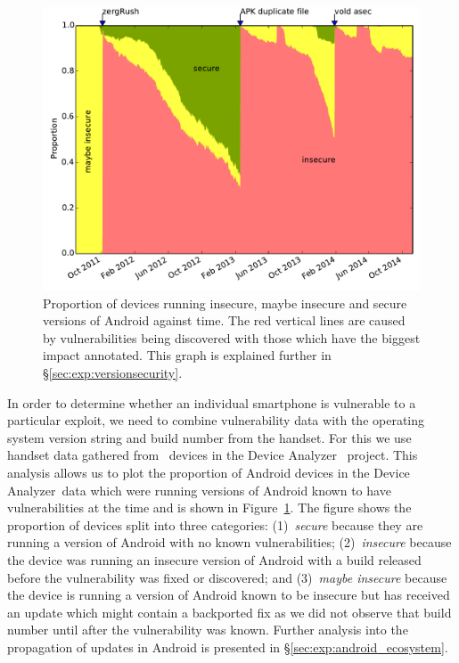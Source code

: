 \documentclass[conference,a4paper,twoside]{IEEEtran}
\newcommand{\da}{Device Analyzer}
\begin{document}
\begin{figure}[h]
\centering
\includegraphics[width=\columnwidth]{figures/proportioninsecure}
\caption{Proportion of devices running insecure, maybe insecure and secure versions of Android against time.
The red vertical lines are caused by vulnerabilities being discovered with those which have the biggest impact annotated.
This graph is explained further in \S\ref{sec:exp:versionsecurity}.
}
\label{fig:proportioninsecure}
\end{figure}

In order to determine whether an individual smartphone is vulnerable to a particular exploit, we need to combine vulnerability data with the operating system version string and build number from the handset. 
For this we use handset data gathered from \daNumOSDevices\ devices in the \da~\cite{Wagner2013} project.
This analysis allows us to plot the proportion of Android devices in the \da\ data which were running versions of Android known to have vulnerabilities at the time and is shown in Figure~\ref{fig:proportioninsecure}.
The figure shows the proportion of devices split into three categories:
(1)~\emph{secure} because they are running a version of Android with no known vulnerabilities; 
(2)~\emph{insecure} because the device was running an insecure version of Android with a build released before the vulnerability was fixed or discovered; and 
(3)~\emph{maybe insecure} because the device is running a version of Android known to be insecure but has received an update which might contain a backported fix as we did not observe that build number until after the vulnerability was known.
Further analysis into the propagation of updates in Android is presented in \S\ref{sec:exp:android_ecosystem}.
\end{document}
